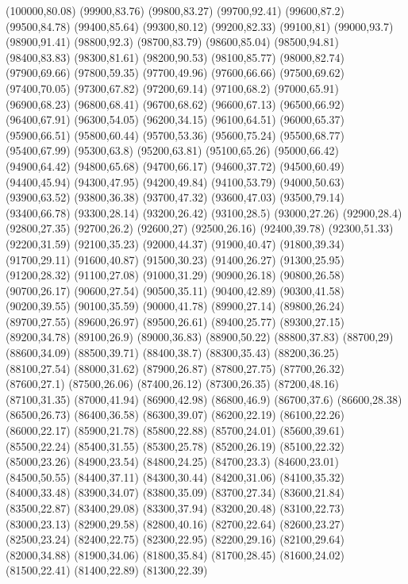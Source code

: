 (100000,80.08)
(99900,83.76)
(99800,83.27)
(99700,92.41)
(99600,87.2)
(99500,84.78)
(99400,85.64)
(99300,80.12)
(99200,82.33)
(99100,81)
(99000,93.7)
(98900,91.41)
(98800,92.3)
(98700,83.79)
(98600,85.04)
(98500,94.81)
(98400,83.83)
(98300,81.61)
(98200,90.53)
(98100,85.77)
(98000,82.74)
(97900,69.66)
(97800,59.35)
(97700,49.96)
(97600,66.66)
(97500,69.62)
(97400,70.05)
(97300,67.82)
(97200,69.14)
(97100,68.2)
(97000,65.91)
(96900,68.23)
(96800,68.41)
(96700,68.62)
(96600,67.13)
(96500,66.92)
(96400,67.91)
(96300,54.05)
(96200,34.15)
(96100,64.51)
(96000,65.37)
(95900,66.51)
(95800,60.44)
(95700,53.36)
(95600,75.24)
(95500,68.77)
(95400,67.99)
(95300,63.8)
(95200,63.81)
(95100,65.26)
(95000,66.42)
(94900,64.42)
(94800,65.68)
(94700,66.17)
(94600,37.72)
(94500,60.49)
(94400,45.94)
(94300,47.95)
(94200,49.84)
(94100,53.79)
(94000,50.63)
(93900,63.52)
(93800,36.38)
(93700,47.32)
(93600,47.03)
(93500,79.14)
(93400,66.78)
(93300,28.14)
(93200,26.42)
(93100,28.5)
(93000,27.26)
(92900,28.4)
(92800,27.35)
(92700,26.2)
(92600,27)
(92500,26.16)
(92400,39.78)
(92300,51.33)
(92200,31.59)
(92100,35.23)
(92000,44.37)
(91900,40.47)
(91800,39.34)
(91700,29.11)
(91600,40.87)
(91500,30.23)
(91400,26.27)
(91300,25.95)
(91200,28.32)
(91100,27.08)
(91000,31.29)
(90900,26.18)
(90800,26.58)
(90700,26.17)
(90600,27.54)
(90500,35.11)
(90400,42.89)
(90300,41.58)
(90200,39.55)
(90100,35.59)
(90000,41.78)
(89900,27.14)
(89800,26.24)
(89700,27.55)
(89600,26.97)
(89500,26.61)
(89400,25.77)
(89300,27.15)
(89200,34.78)
(89100,26.9)
(89000,36.83)
(88900,50.22)
(88800,37.83)
(88700,29)
(88600,34.09)
(88500,39.71)
(88400,38.7)
(88300,35.43)
(88200,36.25)
(88100,27.54)
(88000,31.62)
(87900,26.87)
(87800,27.75)
(87700,26.32)
(87600,27.1)
(87500,26.06)
(87400,26.12)
(87300,26.35)
(87200,48.16)
(87100,31.35)
(87000,41.94)
(86900,42.98)
(86800,46.9)
(86700,37.6)
(86600,28.38)
(86500,26.73)
(86400,36.58)
(86300,39.07)
(86200,22.19)
(86100,22.26)
(86000,22.17)
(85900,21.78)
(85800,22.88)
(85700,24.01)
(85600,39.61)
(85500,22.24)
(85400,31.55)
(85300,25.78)
(85200,26.19)
(85100,22.32)
(85000,23.26)
(84900,23.54)
(84800,24.25)
(84700,23.3)
(84600,23.01)
(84500,50.55)
(84400,37.11)
(84300,30.44)
(84200,31.06)
(84100,35.32)
(84000,33.48)
(83900,34.07)
(83800,35.09)
(83700,27.34)
(83600,21.84)
(83500,22.87)
(83400,29.08)
(83300,37.94)
(83200,20.48)
(83100,22.73)
(83000,23.13)
(82900,29.58)
(82800,40.16)
(82700,22.64)
(82600,23.27)
(82500,23.24)
(82400,22.75)
(82300,22.95)
(82200,29.16)
(82100,29.64)
(82000,34.88)
(81900,34.06)
(81800,35.84)
(81700,28.45)
(81600,24.02)
(81500,22.41)
(81400,22.89)
(81300,22.39)
